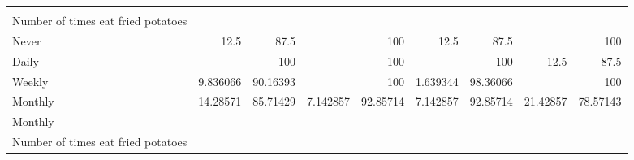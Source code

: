 \documentclass{article}
\begin{document}
\begin{tabular}{lllllllll}
  \multicolumn{1}{r}{} &
  \multicolumn{1}{r}{} &
  \multicolumn{1}{r}{} &
  \multicolumn{1}{r}{} &
  \multicolumn{1}{r}{} &
  \multicolumn{1}{r}{} &
  \multicolumn{1}{r}{} \\
\multicolumn{1}{l}{\hspace{6em}Number of times eat fried potatoes} &
  \multicolumn{1}{|r}{} &
  \multicolumn{1}{r}{} &
  \multicolumn{1}{r}{} &
  \multicolumn{1}{r}{} &
  \multicolumn{1}{r}{} &
  \multicolumn{1}{r}{} &
  \multicolumn{1}{r}{} &
  \multicolumn{1}{r}{} \\
\multicolumn{1}{l}{\hspace{7em}Never} &
  \multicolumn{1}{|r}{12.5} &
  \multicolumn{1}{r}{87.5} &
  \multicolumn{1}{r}{} &
  \multicolumn{1}{r}{100} &
  \multicolumn{1}{r}{12.5} &
  \multicolumn{1}{r}{87.5} &
  \multicolumn{1}{r}{} &
  \multicolumn{1}{r}{100} \\
\multicolumn{1}{l}{\hspace{7em}Daily} &
  \multicolumn{1}{|r}{} &
  \multicolumn{1}{r}{100} &
  \multicolumn{1}{r}{} &
  \multicolumn{1}{r}{100} &
  \multicolumn{1}{r}{} &
  \multicolumn{1}{r}{100} &
  \multicolumn{1}{r}{12.5} &
  \multicolumn{1}{r}{87.5} \\
\multicolumn{1}{l}{\hspace{7em}Weekly} &
  \multicolumn{1}{|r}{9.836066} &
  \multicolumn{1}{r}{90.16393} &
  \multicolumn{1}{r}{} &
  \multicolumn{1}{r}{100} &
  \multicolumn{1}{r}{1.639344} &
  \multicolumn{1}{r}{98.36066} &
  \multicolumn{1}{r}{} &
  \multicolumn{1}{r}{100} \\
\multicolumn{1}{l}{\hspace{7em}Monthly} &
  \multicolumn{1}{|r}{14.28571} &
  \multicolumn{1}{r}{85.71429} &
  \multicolumn{1}{r}{7.142857} &
  \multicolumn{1}{r}{92.85714} &
  \multicolumn{1}{r}{7.142857} &
  \multicolumn{1}{r}{92.85714} &
  \multicolumn{1}{r}{21.42857} &
  \multicolumn{1}{r}{78.57143} \\
\multicolumn{1}{l}{\hspace{5em}Monthly} &
  \multicolumn{1}{|r}{} &
  \multicolumn{1}{r}{} &
  \multicolumn{1}{r}{} &
  \multicolumn{1}{r}{} &
  \multicolumn{1}{r}{} &
  \multicolumn{1}{r}{} &
  \multicolumn{1}{r}{} &
  \multicolumn{1}{r}{} \\
\multicolumn{1}{l}{\hspace{6em}Number of times eat fried potatoes} &
  \multicolumn{1}{|r}{} &
  \multicolumn{1}{r}{} &
  \multicolumn{1}{r}{} &
  \multicolumn{1}{r}{} &
  \multicolumn{1}{r}{} &
  \multicolumn{1}{r}{} &
  \multicolumn{1}{r}{} &

\end{tabular}
\end{document}
